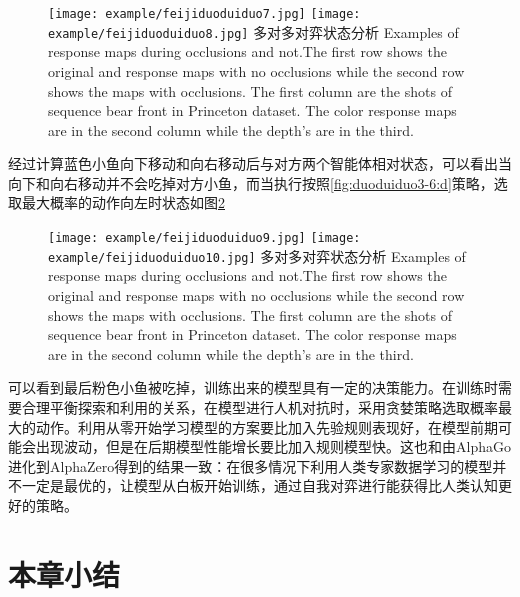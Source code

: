 \begin{figure}[!hpbt]
	\centering
	{\texttt{[image: example/feijiduoduiduo7.jpg]}}
	\hspace{0.5em}
	{\texttt{[image: example/feijiduoduiduo8.jpg]}}
	\bicaption
	{多对多对弈状态分析}
	{Examples of response maps during occlusions and not.The first row shows the original and response maps with no occlusions while the second row shows the maps with occlusions. The first column are the shots of sequence bear front in Princeton dataset. The color response maps are in the second column while the depth’s are in the third.}
	\label{fig2:duoduiduo}
\end{figure}
经过计算蓝色小鱼向下移动和向右移动后与对方两个智能体相对状态，可以看出当向下和向右移动并不会吃掉对方小鱼，而当执行按照\ref{fig:duoduiduo3-6:d}策略，选取最大概率的动作向左时状态如图\ref{fig3:duoduiduo}
\begin{figure}[!hpbt]
	\centering
	{\texttt{[image: example/feijiduoduiduo9.jpg]}}
	\hspace{0.5em}
	{\texttt{[image: example/feijiduoduiduo10.jpg]}}
	\bicaption
	{多对多对弈状态分析}
	{Examples of response maps during occlusions and not.The first row shows the original and response maps with no occlusions while the second row shows the maps with occlusions. The first column are the shots of sequence bear front in Princeton dataset. The color response maps are in the second column while the depth’s are in the third.}
	\label{fig3:duoduiduo}
\end{figure}
可以看到最后粉色小鱼被吃掉，训练出来的模型具有一定的决策能力。在训练时需要合理平衡探索和利用的关系，在模型进行人机对抗时，采用贪婪策略选取概率最大的动作。利用从零开始学习模型的方案要比加入先验规则表现好，在模型前期可能会出现波动，但是在后期模型性能增长要比加入规则模型快。这也和由AlphaGo进化到AlphaZero得到的结果一致：在很多情况下利用人类专家数据学习的模型并不一定是最优的，让模型从白板开始训练，通过自我对弈进行能获得比人类认知更好的策略。
\section{本章小结}



